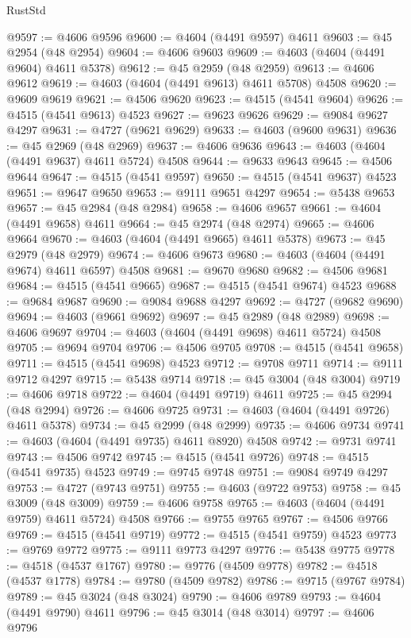\begin{lexlean}{RustStd}
\begin{coremodule}
@9597 := @4606 @9596
@9600 := @4604 (@4491 @9597) @4611
@9603 := @45 @2954 (@48 @2954)
@9604 := @4606 @9603
@9609 := @4603 (@4604 (@4491 @9604) @4611 @5378)
@9612 := @45 @2959 (@48 @2959)
@9613 := @4606 @9612
@9619 := @4603 (@4604 (@4491 @9613) @4611 @5708) @4508
@9620 := @9609 @9619
@9621 := @4506 @9620
@9623 := @4515 (@4541 @9604)
@9626 := @4515 (@4541 @9613) @4523
@9627 := @9623 @9626
@9629 := @9084 @9627 @4297
@9631 := @4727 (@9621 @9629)
@9633 := @4603 (@9600 @9631)
@9636 := @45 @2969 (@48 @2969)
@9637 := @4606 @9636
@9643 := @4603 (@4604 (@4491 @9637) @4611 @5724) @4508
@9644 := @9633 @9643
@9645 := @4506 @9644
@9647 := @4515 (@4541 @9597)
@9650 := @4515 (@4541 @9637) @4523
@9651 := @9647 @9650
@9653 := @9111 @9651 @4297
@9654 := @5438 @9653
@9657 := @45 @2984 (@48 @2984)
@9658 := @4606 @9657
@9661 := @4604 (@4491 @9658) @4611
@9664 := @45 @2974 (@48 @2974)
@9665 := @4606 @9664
@9670 := @4603 (@4604 (@4491 @9665) @4611 @5378)
@9673 := @45 @2979 (@48 @2979)
@9674 := @4606 @9673
@9680 := @4603 (@4604 (@4491 @9674) @4611 @6597) @4508
@9681 := @9670 @9680
@9682 := @4506 @9681
@9684 := @4515 (@4541 @9665)
@9687 := @4515 (@4541 @9674) @4523
@9688 := @9684 @9687
@9690 := @9084 @9688 @4297
@9692 := @4727 (@9682 @9690)
@9694 := @4603 (@9661 @9692)
@9697 := @45 @2989 (@48 @2989)
@9698 := @4606 @9697
@9704 := @4603 (@4604 (@4491 @9698) @4611 @5724) @4508
@9705 := @9694 @9704
@9706 := @4506 @9705
@9708 := @4515 (@4541 @9658)
@9711 := @4515 (@4541 @9698) @4523
@9712 := @9708 @9711
@9714 := @9111 @9712 @4297
@9715 := @5438 @9714
@9718 := @45 @3004 (@48 @3004)
@9719 := @4606 @9718
@9722 := @4604 (@4491 @9719) @4611
@9725 := @45 @2994 (@48 @2994)
@9726 := @4606 @9725
@9731 := @4603 (@4604 (@4491 @9726) @4611 @5378)
@9734 := @45 @2999 (@48 @2999)
@9735 := @4606 @9734
@9741 := @4603 (@4604 (@4491 @9735) @4611 @8920) @4508
@9742 := @9731 @9741
@9743 := @4506 @9742
@9745 := @4515 (@4541 @9726)
@9748 := @4515 (@4541 @9735) @4523
@9749 := @9745 @9748
@9751 := @9084 @9749 @4297
@9753 := @4727 (@9743 @9751)
@9755 := @4603 (@9722 @9753)
@9758 := @45 @3009 (@48 @3009)
@9759 := @4606 @9758
@9765 := @4603 (@4604 (@4491 @9759) @4611 @5724) @4508
@9766 := @9755 @9765
@9767 := @4506 @9766
@9769 := @4515 (@4541 @9719)
@9772 := @4515 (@4541 @9759) @4523
@9773 := @9769 @9772
@9775 := @9111 @9773 @4297
@9776 := @5438 @9775
@9778 := @4518 (@4537 @1767)
@9780 := @9776 (@4509 @9778)
@9782 := @4518 (@4537 @1778)
@9784 := @9780 (@4509 @9782)
@9786 := @9715 (@9767 @9784)
@9789 := @45 @3024 (@48 @3024)
@9790 := @4606 @9789
@9793 := @4604 (@4491 @9790) @4611
@9796 := @45 @3014 (@48 @3014)
@9797 := @4606 @9796

\end{coremodule}
\end{lexlean}
